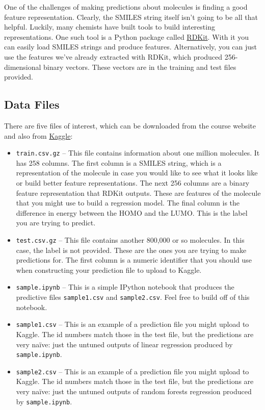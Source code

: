 \documentclass[12pt]{article}
\begin{document}
	One of the challenges of making predictions about molecules is finding a good feature representation.  Clearly, the SMILES string itself isn't going to be all that helpful.  Luckily, many chemists have built tools to build interesting representations.  One such tool is a Python package called \href{http://www.rdkit.org/}{RDKit}.  With it you can easily load SMILES strings and produce features. Alternatively, you can just use the features we've already extracted with RDKit, which produced 256-dimensional binary vectors.  These vectors are in the training and test files provided.
	
	\subsection*{Data Files}
	There are five files of interest, which can be downloaded from the course website and also from \href{https://inclass.kaggle.com/c/cs181-s16-practical-1-predicting-the-efficiency-of-photovoltaic-molecules}{Kaggle}:
	\begin{itemize}
		\item \verb|train.csv.gz| -- This file contains information about one million molecules.  It has 258 columns.  The first column is a SMILES string, which is a representation of the molecule in case you would like to see what it looks like or build better feature representations. The next 256 columns are a binary feature representation that RDKit outputs.  These are features of the molecule that you might use to build a regression model.  The final column is the difference in energy between the HOMO and the LUMO.  This is the label you are trying to predict.
		\item \verb|test.csv.gz| -- This file contains another 800,000 or so molecules.  In this case, the label is not provided.  These are the ones you are trying to make predictions for. The first column is a numeric identifier that you should use when constructing your prediction file to upload to Kaggle.
		\item \verb|sample.ipynb| -- This is a simple IPython notebook that produces the predictive files \verb|sample1.csv| and \verb|sample2.csv|.  Feel free to build off of this notebook.
		\item \verb|sample1.csv| -- This is an example of a prediction file you might upload to Kaggle.  The id numbers match those in the test file, but the predictions are very na\"ive: just the untuned outputs of linear regression produced by \verb|sample.ipynb|.
		\item \verb|sample2.csv| -- This is an example of a prediction file you might upload to Kaggle.  The id numbers match those in the test file, but the predictions are very na\"ive: just the untuned outputs of random forests regression produced by \verb|sample.ipynb|.
	\end{itemize}
	
\end{document}
